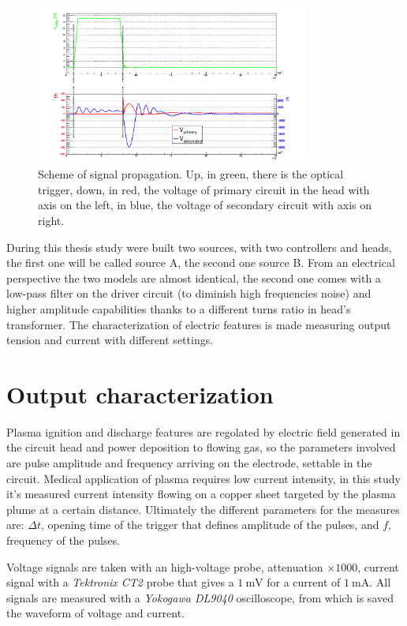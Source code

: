 \begin{figure}
 \centering
 \includegraphics[width=0.8\textwidth]{Images/Electric/segnali.png}
 \caption{Scheme of signal propagation. Up, in green, there is the optical trigger, down, in red, the voltage of primary circuit in the head with axis on the left, in blue, the voltage of secondary circuit with axis on right.}
 \label{fig:signals}
\end{figure}

During this thesis study were built two sources, with two controllers and heads, the first one will be called source A, the second one source B. From an electrical perspective the two models are almost identical, the second one comes with a low-pass filter on the driver circuit (to diminish high frequencies noise) and higher amplitude capabilities thanks to a different turns ratio in head's transformer.
The characterization of electric features is made measuring output tension and current with different settings.

\section{Output characterization}
Plasma ignition and discharge features are regolated by electric field generated in the circuit head and power deposition to flowing gas, so the parameters involved are pulse amplitude and frequency arriving on the electrode, settable in the circuit. Medical application of plasma requires low current intensity, in this study it's measured current intensity flowing on a copper sheet targeted by the plasma plume at a certain distance. Ultimately the different parameters for the measures are: $\Delta t$, opening time of the trigger that defines amplitude of the pulses, and $f$, frequency of the pulses. 

Voltage signals are taken with an high-voltage probe, attenuation $\times 1000$, current signal with a \emph{Tektronix CT2} probe that gives a $\SI{1}{\milli\volt}$ for a current of $\SI{1}{\milli\ampere}$. All signals are measured with a \emph{Yokogawa DL9040} oscilloscope, from which is saved the waveform of voltage and current.

